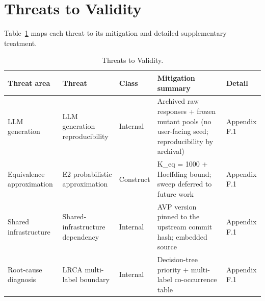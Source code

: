 \documentclass[review,12pt,authoryear]{elsarticle}
\begin{document}

\section{Threats to Validity}\label{threats-to-validity}

Table~\ref{tab:p2-14} maps each threat to its mitigation and detailed
supplementary treatment.
{\def\LTcaptype{table} %
\begin{longtable}[]{@{}
  >{\raggedright\arraybackslash}p{}
  >{\raggedright\arraybackslash}p{}
  >{\raggedright\arraybackslash}p{}
  >{\raggedright\arraybackslash}p{}
  >{\raggedright\arraybackslash}p{}@{}}
\caption{Threats to Validity.}\label{tab:p2-14}\\
\toprule\noalign{}
\begin{minipage}[b]{\linewidth}\raggedright
Threat area
\end{minipage} & \begin{minipage}[b]{\linewidth}\raggedright
Threat
\end{minipage} & \begin{minipage}[b]{\linewidth}\raggedright
Class
\end{minipage} & \begin{minipage}[b]{\linewidth}\raggedright
Mitigation summary
\end{minipage} & \begin{minipage}[b]{\linewidth}\raggedright
Detail
\end{minipage} \\
\midrule\noalign{}
\endfirsthead
\endhead
\bottomrule\noalign{}
\endlastfoot
LLM generation & LLM generation reproducibility & Internal & Archived raw responses
+ frozen mutant pools (no user-facing seed; reproducibility by archival) & Appendix F.1 \\
Equivalence approximation & E2 probabilistic approximation & Construct & K\_eq = 1000 +
Hoeffding bound; sweep deferred to future work & Appendix F.1 \\
Shared infrastructure & Shared-infrastructure dependency & Internal & AVP version pinned to the upstream
commit hash; embedded source & Appendix F.1 \\
Root-cause diagnosis & LRCA multi-label boundary & Internal & Decision-tree priority +
multi-label co-occurrence table & Appendix F.1 \\

\end{longtable}}
\end{document}
